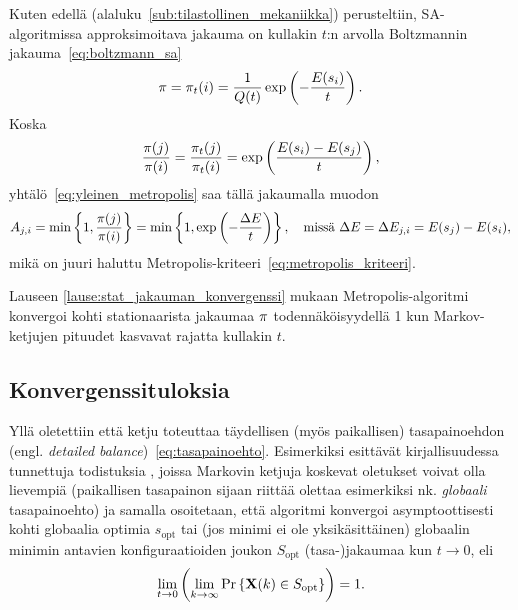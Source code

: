Kuten edellä (alaluku~\ref{sub:tilastollinen_mekaniikka}) perusteltiin, SA-algoritmissa approksimoitava jakauma \vect{\pi} on  kullakin $t$:n arvolla Boltzmannin jakauma~\eqref{eq:boltzmann_sa}
\begin{equation}
    \mathbf{\pi} = \mathbf{\pi}_t(i) = \frac{1}{Q(t)} \exp \left(-\frac{E(s_i)}{t}\right).
\end{equation}
Koska
\begin{equation}
    \frac{\mathbf{\pi}(j)}{\mathbf{\pi}(i)} = \frac{\mathbf{\pi}_t(j)}{\mathbf{\pi}_t(i)} = \exp \left(\frac{E(s_i) - E(s_j)}{t}\right),
\end{equation}
yhtälö~\eqref{eq:yleinen_metropolis} saa tällä jakaumalla muodon
\begin{equation}
    \label{eq:boltzmann_metropolis}
    A_{j,i} = \min\left\{1, \frac{\mathbf{\pi}(j)}{\mathbf{\pi}(i)}\right\} = \min\left\{1, \exp \left(-\frac{\Delta E}{t}\right)\right\}, \quad \text{missä } \Delta E = \Delta E_{j,i} = E(s_j) - E(s_i),
\end{equation}
mikä on juuri haluttu Metropolis-kriteeri~\eqref{eq:metropolis_kriteeri}.

Lauseen  \ref{lause:stat_jakauman_konvergenssi} mukaan Metropolis-algoritmi konvergoi kohti stationaarista jakaumaa $\mathbf{\pi}$ todennäköisyydellä 1 kun Markov-ketjujen pituudet kasvavat rajatta kullakin $t$.

\subsection{Konvergenssituloksia}
\label{sub:Konvergenssituloksia}

Yllä oletettiin että ketju toteuttaa täydellisen (myös paikallisen) tasapainoehdon (engl. \emph{detailed balance})~\eqref{eq:tasapainoehto}.
Esimerkiksi \citeauthor{laarhoven} esittävät kirjallisuudessa tunnettuja todistuksia \cite[Luvut 3.1.2, 3.1.3]{laarhoven},
joissa Markovin ketjuja koskevat oletukset voivat olla lievempiä (paikallisen tasapainon sijaan riittää olettaa esimerkiksi nk. \emph{globaali} tasapainoehto)
ja samalla osoitetaan, että algoritmi konvergoi asymptoottisesti kohti globaalia optimia $s_\text{opt}$ tai (jos minimi ei ole yksikäsittäinen) globaalin minimin antavien konfiguraatioiden joukon $S_\text{opt}$ (tasa-)jakaumaa kun $t \to 0$,
eli
\begin{equation}
    \lim_{t \to 0} \left(\lim_{k \to \infty}\Pr\left\{\mathbf{X}(k) \in S_\text{opt}\right\} \right) = 1.
\end{equation}

